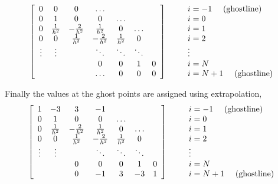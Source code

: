 \begin{equation*}
   \left[\begin{array}{ccccccc}
         0    & 0    & 0    &\ldots&      &      &    \\
           0  &  1   &  0   & 0    &\ldots&      &   \\
         0    & {1\over h^2} & -{2\over h^2} & {1\over h^2} &  0   &\ldots&   \\
         0    &  0   & {1\over h^2} & -{2\over h^2} & {1\over h^2} &  0   &   \\
        \vdots&\vdots&      &\ddots&\ddots&\ddots&    \\
              &      &      &  0   &  0   &  1   &  0   \\
              &      &      &\ldots&  0   &   0  &  0   
    \end{array} \right]
  \qquad
   \begin{array}{l}
    i=-1~~~~{\rm (ghost line)}\\i=0\\i=1\\i=2\\ \vdots \\ i=N\\ i=N+1~~~~{\rm (ghost line)}
   \end{array}
\end{equation*}

Finally the values at the ghost points are assigned using extrapolation,
\begin{equation*}
   \left[\begin{array}{ccccccc}
         1    & -3   &  3   & -1   &      &      &    \\
           0  &  1   &  0   & 0    &\ldots&      &   \\
         0    & {1\over h^2} & -{2\over h^2} & {1\over h^2} &  0   &\ldots&   \\
         0    &  0   & {1\over h^2} & -{2\over h^2} & {1\over h^2} &  0   &   \\
        \vdots&\vdots&      &\ddots&\ddots&\ddots&    \\
              &      &  0   &  0   &  0   &  1   &  0   \\
              &      &  0   & -1   &  3   & -3   &  1   
    \end{array} \right]
  \qquad
   \begin{array}{l}
    i=-1~~~~{\rm (ghost line)}\\i=0\\i=1\\i=2\\ \vdots \\ i=N\\ i=N+1~~~~{\rm (ghost line)}
   \end{array}
\end{equation*}


